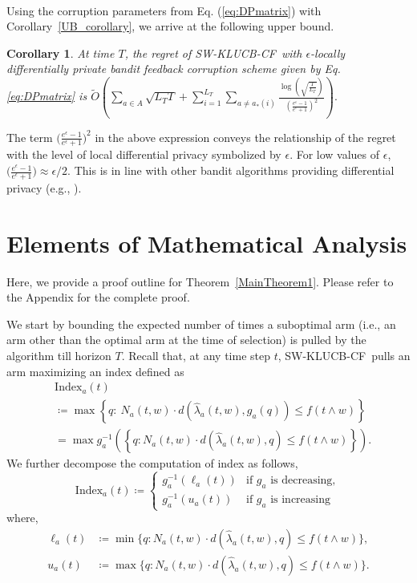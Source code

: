 \documentclass[letterpaper]{article} %
\newcommand{\defined}{\coloneqq}
\newcommand{\SWKLUCBCF}{\textsc{SW-KLUCB-CF}}
\newcommand{\optArmAtIChanges}[1]{a_{*}(#1)}
\newcommand{\numChanges}{L}
\newcommand{\windowsize}{w}
\newcounter{counterCorollary}
\newtheorem{myCorollary}[counterCorollary]{Corollary}
\begin{document}
\paragraph{}
Using the corruption parameters from Eq. (\ref{eq:DPmatrix}) with  Corollary~\ref{UB_corollary}, we arrive  at the following upper bound.
\begin{myCorollary}
\label{DPUB_corollary}At time $T$,
the regret of \SWKLUCBCF \  with $\epsilon$-locally differentially private bandit feedback corruption scheme given by Eq. \eqref{eq:DPmatrix} is
$
\tilde{O}\left( \sum_{a \in A} \sqrt{\numChanges_T T} + \sum_{i=1}^{\numChanges_T} \sum_{a \neq \optArmAtIChanges{i}} \frac{\log{\left(  \sqrt{ \frac{T}{\numChanges_T}} \right)}}{\left( \frac{e^\epsilon - 1}{e^\epsilon + 1}\right)^2} \right).
$
\end{myCorollary}
The term $\big( \frac{e^\epsilon - 1}{e^\epsilon + 1}\big)^2$ in the above expression conveys the relationship of the regret with the level of local differential privacy symbolized by $\epsilon$. For low values of $\epsilon$,  $ \big( \frac{e^\epsilon - 1}{e^\epsilon + 1}\big) \approx \epsilon / 2 $. This is in line with other bandit algorithms providing differential privacy (e.g., \citet{DBLP:conf/uai/MishraT15}).

\section{Elements of Mathematical Analysis}
Here, we provide a proof outline for Theorem~\ref{MainTheorem1}. Please refer to the Appendix for the complete proof.

We start by bounding the expected number of times a suboptimal arm (i.e., an arm other than the optimal arm at the time of selection) is pulled by the algorithm till horizon $T$. Recall that, at any time step $t$, \SWKLUCBCF \ pulls an arm maximizing an index defined as
\begin{align*}
& \mathrm{Index}_a(t) \\
&\defined \max \left\{ q:\  N_a(t, \windowsize)\cdot{}d\left(\hat{\lambda}_a(t, \windowsize), g_a(q)\right) \leq f\left(t \wedge \windowsize\right) \right\} \\
&= \max g_a^{-1}\left( \left\{q: N_a(t, \windowsize)\cdot{}d\left(\hat{\lambda}_a(t, \windowsize), q\right) \leq f\left(t \wedge \windowsize\right)\right\} \right).
\end{align*}
We further decompose the computation of index as follows,
$$\mathrm{Index}_a(t) \defined
\begin{cases}
g_a^{-1}({\ell_a(t)}) & \text{if } g_a \text{ is decreasing}, \\
g_a^{-1}({u_a(t)}) & \text{if } g_a \text{ is increasing}
\end{cases}
$$
where,
\begin{align*}
\ell_a(t)  &\defined  \min \Big\{q: N_a(t, \windowsize)\cdot{}d\left(\hat{\lambda}_a(t, \windowsize), q\right) \leq f\left( t \wedge \windowsize \right)\Big\}, \\
u_a(t)  &\defined  \max \Big\{q: N_a(t, \windowsize)\cdot{}d\left(\hat{\lambda}_a(t, \windowsize), q\right) \leq f\left( t \wedge\windowsize \right) \Big\}.
\end{align*}
\end{document}
